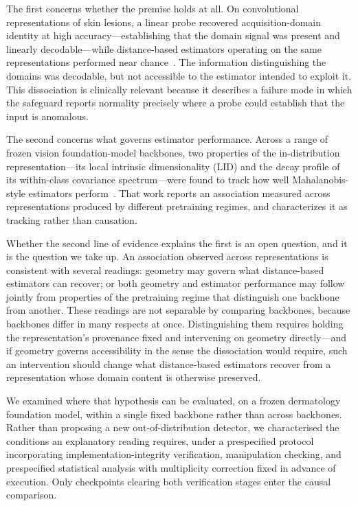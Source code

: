 The first concerns whether the premise holds at all. On convolutional
representations of skin lesions, a linear probe recovered acquisition-domain
identity at high accuracy---establishing that the domain signal was present
and linearly decodable---while distance-based estimators operating on the
same representations performed near chance~\cite{tran2026decodable}. The
information distinguishing the domains was decodable, but not accessible to
the estimator intended to exploit it. This dissociation is clinically
relevant because it describes a failure mode in which the safeguard reports
normality precisely where a probe could establish that the input is
anomalous.

The second concerns what governs estimator performance. Across a range of
frozen vision foundation-model backbones, two properties of the
in-distribution representation---its local intrinsic dimensionality (LID) and
the decay profile of its within-class covariance spectrum---were found to
track how well Mahalanobis-style estimators perform~\cite{yu2510dissecting}.
That work reports an association measured across representations produced by
different pretraining regimes, and characterizes it as tracking rather than
causation.

Whether the second line of evidence explains the first is an open question,
and it is the question we take up. An association observed across
representations is consistent with several readings: geometry may govern what
distance-based estimators can recover; or both geometry and estimator
performance may follow jointly from properties of the pretraining regime that
distinguish one backbone from another. These readings are not separable by
comparing backbones, because backbones differ in many respects at once.
Distinguishing them requires holding the representation's provenance fixed
and intervening on geometry directly---and if geometry governs accessibility
in the sense the dissociation would require, such an intervention should
change what distance-based estimators recover from a representation whose
domain content is otherwise preserved.

We examined where that hypothesis can be evaluated, on a frozen dermatology
foundation model, within a single fixed backbone rather than across backbones.
Rather than proposing a new out-of-distribution detector, we characterised the
conditions an explanatory reading requires,
under a prespecified protocol incorporating implementation-integrity
verification, manipulation checking, and prespecified statistical analysis
with multiplicity correction fixed in advance of execution. Only checkpoints
clearing both verification stages enter the causal comparison.


